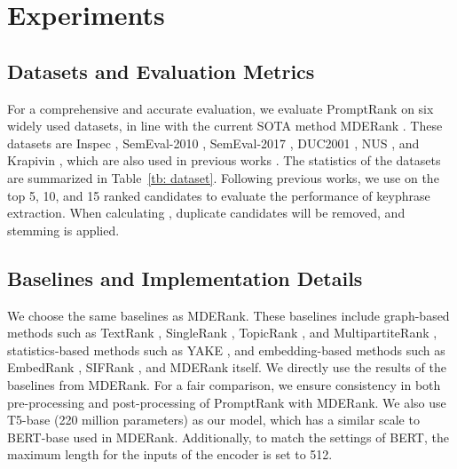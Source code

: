 \documentclass[11pt]{article}
\begin{document}
\section{Experiments}
\label{section: 4}







\subsection{Datasets and Evaluation Metrics}
For a comprehensive and accurate evaluation, we evaluate PromptRank on six widely used datasets, in line with the current SOTA method MDERank \cite{zhang-etal-2022-mderank}. These datasets are Inspec \cite{hulth-2003-improved}, SemEval-2010 \cite{kim-etal-2010-semeval}, SemEval-2017 \cite{augenstein-etal-2017-semeval}, DUC2001 \cite{wan2008single}, NUS \cite{10.1007/978-3-540-77094-7_41}, and Krapivin \cite{krapivin2009large}, which are also used in previous works \cite{bennani-smires-etal-2018-simple, 8954611, saxena-etal-2020-keygames, ding-luo-2021-attentionrank}. The statistics of the datasets are summarized in Table~\ref{tb: dataset}. Following previous works, we use  on the top 5, 10, and 15 ranked candidates to evaluate the performance of keyphrase extraction. When calculating , duplicate candidates will be removed, and stemming is applied.

\subsection{Baselines and Implementation Details}
We choose the same baselines as MDERank. These baselines include graph-based methods such as TextRank \cite{mihalcea-tarau-2004-textrank}, SingleRank \cite{wan2008single}, TopicRank \cite{bougouin-etal-2013-topicrank}, and MultipartiteRank \cite{boudin-2018-unsupervised}, statistics-based methods such as YAKE \cite{campos2020yake}, and embedding-based methods such as EmbedRank \cite{bennani-smires-etal-2018-simple}, SIFRank \cite{8954611}, and MDERank\cite{zhang-etal-2022-mderank} itself. We directly use the results of the baselines from MDERank. For a fair comparison, we ensure consistency in both pre-processing and post-processing of PromptRank with MDERank. We also use T5-base (220 million parameters) as our model, which has a similar scale to BERT-base \cite{devlin-etal-2019-bert} used in MDERank. Additionally, to match the settings of BERT, the maximum length for the inputs of the encoder is set to 512.
\end{document}

